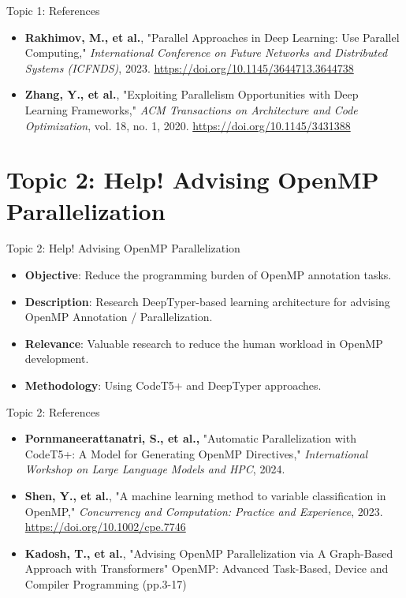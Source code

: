 \documentclass{beamer}
\begin{document}
\begin{frame}{Topic 1: References}
\begin{itemize}
    \item \textbf{Rakhimov, M., et al.}, "Parallel Approaches in Deep Learning: Use Parallel Computing," \textit{International Conference on Future Networks and Distributed Systems (ICFNDS)}, 2023. \url{https://doi.org/10.1145/3644713.3644738}
    \item \textbf{Zhang, Y., et al.}, "Exploiting Parallelism Opportunities with Deep Learning Frameworks," \textit{ACM Transactions on Architecture and Code Optimization}, vol. 18, no. 1, 2020. \url{https://doi.org/10.1145/3431388}

\end{itemize}
\end{frame}

\section{Topic 2: Help! Advising OpenMP Parallelization}
\begin{frame}{Topic 2: Help! Advising OpenMP Parallelization}
\begin{itemize}
    \item \textbf{Objective}: Reduce the programming burden of OpenMP annotation tasks.
    \item \textbf{Description}: Research DeepTyper-based learning architecture for advising OpenMP Annotation / Parallelization.
    \item \textbf{Relevance}: Valuable research to reduce the human workload in OpenMP development.
    \item \textbf{Methodology}: Using CodeT5+ and DeepTyper approaches.
\end{itemize}
\end{frame}

\begin{frame}{Topic 2: References}
\begin{itemize}
    \item \textbf{Pornmaneerattanatri, S., et al.,} "Automatic Parallelization with CodeT5+: A Model for Generating OpenMP Directives," \textit{International Workshop on Large Language Models and HPC}, 2024.
    \item \textbf{Shen, Y., et al.}, "A machine learning method to variable classification in OpenMP," \textit{Concurrency and Computation: Practice and Experience}, 2023. \url{https://doi.org/10.1002/cpe.7746}
    \item \textbf{Kadosh, T., et al.}, "Advising OpenMP Parallelization via A Graph-Based Approach with Transformers"
    OpenMP: Advanced Task-Based, Device and Compiler Programming (pp.3-17) 
\end{itemize}
\end{frame}
\end{document}
